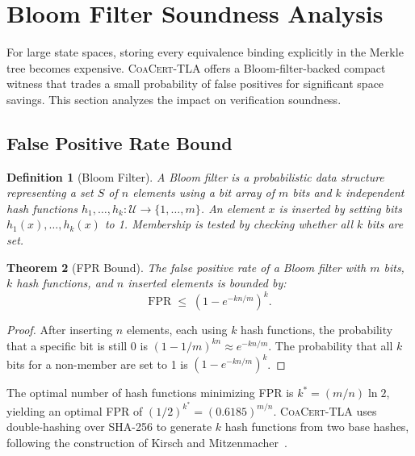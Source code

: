 \documentclass[11pt]{article}
\newtheorem{theorem}{Theorem}
\newtheorem{definition}[theorem]{Definition}
\newcommand{\CoaCert}{\textsc{CoaCert-TLA}}
\newcommand{\FPR}{\ensuremath{\mathrm{FPR}}}
\begin{document}
\section{Bloom Filter Soundness Analysis}
\label{sec:bloom}

For large state spaces, storing every equivalence binding explicitly in the
Merkle tree becomes expensive.
\CoaCert{} offers a Bloom-filter-backed compact witness that trades a small
probability of false positives for significant space savings.
This section analyzes the impact on verification soundness.

\subsection{False Positive Rate Bound}

\begin{definition}[Bloom Filter]
A Bloom filter is a probabilistic data structure representing a set $S$
of $n$ elements using a bit array of $m$ bits and $k$ independent hash
functions $h_1, \ldots, h_k : \mathcal{U} \to \{1, \ldots, m\}$.
An element $x$ is inserted by setting bits $h_1(x), \ldots, h_k(x)$ to 1.
Membership is tested by checking whether all $k$ bits are set.
\end{definition}

\begin{theorem}[FPR Bound]
\label{thm:fpr}
The false positive rate of a Bloom filter with $m$ bits, $k$ hash
functions, and $n$ inserted elements is bounded by:
\begin{equation}\label{eq:fpr}
  \FPR \;\leq\; \left(1 - e^{-kn/m}\right)^k.
\end{equation}
\end{theorem}

\begin{proof}
After inserting $n$ elements, each using $k$ hash functions, the probability
that a specific bit is still 0 is $(1 - 1/m)^{kn} \approx e^{-kn/m}$.
The probability that all $k$ bits for a non-member are set to 1 is
$(1 - e^{-kn/m})^k$.
\end{proof}

The optimal number of hash functions minimizing FPR is $k^* = (m/n) \ln 2$,
yielding an optimal FPR of $(1/2)^{k^*} = (0.6185)^{m/n}$.
\CoaCert{} uses double-hashing over SHA-256 to generate $k$ hash functions
from two base hashes, following the construction of
Kirsch and Mitzenmacher~\cite{KirschM06}.
\end{document}
